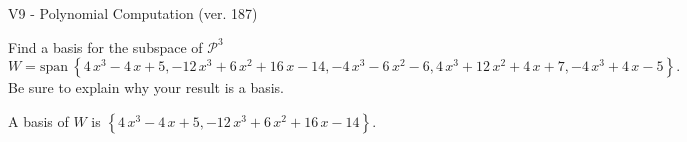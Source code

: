 \begin{exercise}
  \begin{exerciseTitle}V9 - Polynomial Computation (ver. 187)\end{exerciseTitle}
  \begin{exerciseStatement}
    Find a basis for the subspace of \(\mathcal{P}^3\) 
\[W=\mathrm{span}\ \left\{4 \, x^{3} - 4 \, x + 5 , -12 \, x^{3} + 6 \, x^{2} + 16 \, x - 14 , -4 \, x^{3} - 6 \, x^{2} - 6 , 4 \, x^{3} + 12 \, x^{2} + 4 \, x + 7 , -4 \, x^{3} + 4 \, x - 5\right\}.\]
 Be sure to explain why your result is a basis.


  \end{exerciseStatement}
  \begin{exerciseAnswer}
   A basis of \(W\) is  \(\left\{4 \, x^{3} - 4 \, x + 5 , -12 \, x^{3} + 6 \, x^{2} + 16 \, x - 14\right\}\).
  


  \end{exerciseAnswer}
\end{exercise}